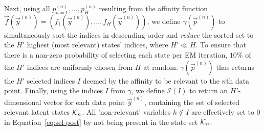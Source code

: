 %
Next, using all $p_{h=1}^{(n)},\dots, p_H^{(n)}$ resulting 
from the affinity function 
$\vec{f}(\vec{y}^{(n)}) = (f_1(\vec{y}^{(n)}), \dots, f_H(\vec{y}^{(n)}))$, we define 
 $\gamma(\vec{p}^{(n)})$ to simultaneously sort the indices in descending order and \textit{reduce} the sorted set to the $H'$ highest (most relevant) states' indices, where $H' \ll H$.
To ensure that there is a non-zero probability of selecting each state per EM iteration, $10\%$ of the $H'$ indices are uniformly chosen from $H$ at random.
$\gamma(\vec{p}^{(n)})$ thus returns the $H'$ selected indices $I$ deemed by the affinity to be relevant to the $n$th data point.
%
%
%
Finally, using the indices $I$ from $\gamma$, we define $\mathcal{I}(I)$ to return an $H'$-dimensional vector for each data point $\vec{y}^{(n)}$, containing the set of selected relevant latent states $\mathcal{K}_{n}$. 
All 'non-relevant' variables $h\not\in I$ are effectively set to $0$ in Equation~\eqref{eq:sel-post} 
by not being present in the state set $\mathcal{K}_{n}$.
%
%

